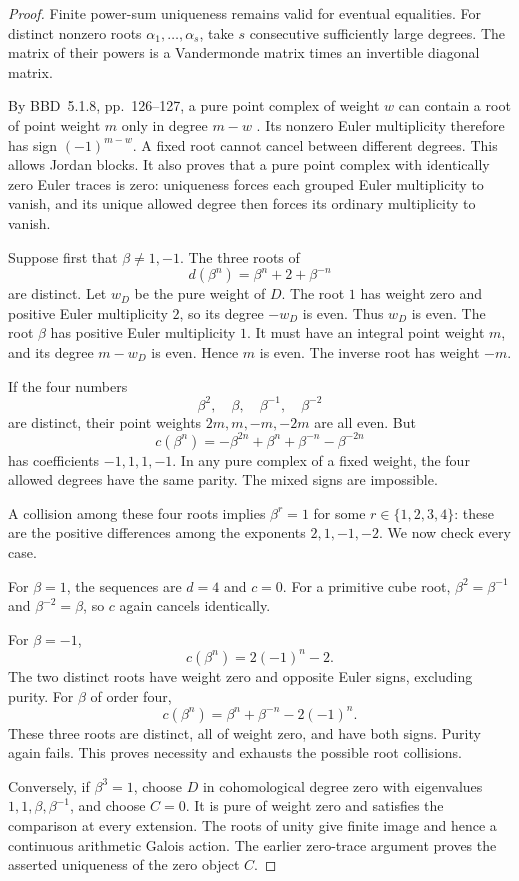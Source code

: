 \begin{proof}
Finite power-sum uniqueness remains valid for eventual
equalities. For distinct nonzero roots
\(\alpha_1,\ldots,\alpha_s\), take \(s\) consecutive
sufficiently large degrees. The matrix of their powers
is a Vandermonde matrix times an invertible diagonal
matrix.

By BBD~5.1.8, pp.~126--127, a pure point complex of
weight \(w\) can contain a root of point weight \(m\)
only in degree \(m-w\) \cite{BBD}.
Its nonzero Euler multiplicity therefore has sign
\((-1)^{m-w}\). A fixed root cannot cancel between
different degrees. This allows Jordan blocks.
It also proves that a pure point complex with
identically zero Euler traces is zero: uniqueness
forces each grouped Euler multiplicity to vanish,
and its unique allowed degree then forces its
ordinary multiplicity to vanish.

Suppose first that \(\beta\ne1,-1\).
The three roots of
\[
                     d(\beta^n)=\beta^n+2+\beta^{-n}
\]
are distinct. Let \(w_D\) be the pure weight of \(D\).
The root \(1\) has weight zero and positive Euler
multiplicity \(2\), so its degree \(-w_D\) is even.
Thus \(w_D\) is even.
The root \(\beta\) has positive Euler multiplicity \(1\).
It must have an integral point weight \(m\), and its
degree \(m-w_D\) is even. Hence \(m\) is even.
The inverse root has weight \(-m\).

If the four numbers
\[
                    \beta^2,\quad\beta,\quad
                    \beta^{-1},\quad\beta^{-2}
\]
are distinct, their point weights \(2m,m,-m,-2m\)
are all even. But
\[
                 c(\beta^n)
                  =-\beta^{2n}+\beta^n+\beta^{-n}-\beta^{-2n}
\]
has coefficients \(-1,1,1,-1\). In any pure complex
of a fixed weight, the four allowed degrees have the
same parity. The mixed signs are impossible.

A collision among these four roots implies
\(\beta^r=1\) for some \(r\in\{1,2,3,4\}\):
these are the positive differences among the exponents
\(2,1,-1,-2\). We now check every case.

For \(\beta=1\), the sequences are \(d=4\) and \(c=0\).
For a primitive cube root,
\(\beta^2=\beta^{-1}\) and
\(\beta^{-2}=\beta\), so \(c\) again cancels identically.

For \(\beta=-1\),
\[
                         c(\beta^n)=2(-1)^n-2.
\]
The two distinct roots have weight zero and opposite
Euler signs, excluding purity.
For \(\beta\) of order four,
\[
                         c(\beta^n)
                         =\beta^n+\beta^{-n}-2(-1)^n.
\]
These three roots are distinct, all of weight zero,
and have both signs. Purity again fails.
This proves necessity and exhausts the possible
root collisions.

Conversely, if \(\beta^3=1\), choose \(D\) in
cohomological degree zero with eigenvalues
\(1,1,\beta,\beta^{-1}\), and choose \(C=0\).
It is pure of weight zero and satisfies the comparison
at every extension. The roots of unity give finite
image and hence a continuous arithmetic Galois action.
The earlier zero-trace argument proves the asserted
uniqueness of the zero object \(C\).
\end{proof}

